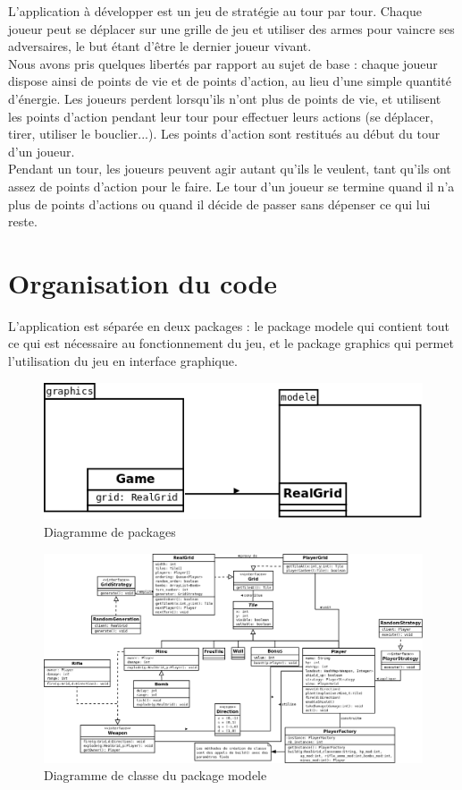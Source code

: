 \documentclass[a4paper,12pt]{article} %
\begin{document}
L'application à développer est un jeu de stratégie au tour par tour. Chaque joueur peut se déplacer sur une grille de jeu et utiliser des armes pour vaincre ses adversaires, le but étant d'être le dernier joueur vivant.\\
Nous avons pris quelques libertés par rapport au sujet de base : chaque joueur dispose ainsi de points de vie et de points d'action, au lieu d'une simple quantité d'énergie.
Les joueurs perdent lorsqu'ils n'ont plus de points de vie, et utilisent les points d'action pendant leur tour pour effectuer leurs actions (se déplacer, tirer, utiliser le bouclier...). Les points d'action sont restitués au début du tour d'un joueur.\\
Pendant un tour, les joueurs peuvent agir autant qu'ils le veulent, tant qu'ils ont assez de points d'action pour le faire. Le tour d'un joueur se termine quand il n'a plus de points d'actions ou quand il décide de passer sans dépenser ce qui lui reste.

\section{Organisation du code}

L'application est séparée en deux packages : le package modele qui contient tout ce qui est nécessaire au fonctionnement du jeu, et le package graphics qui permet l'utilisation du jeu en interface graphique.

\begin{figure}[!h]
\centering
\includegraphics[scale=0.5]{images/packages.png}
\caption{Diagramme de packages}
\end{figure}

\begin{figure}[!h]
\centering
\includegraphics[scale=0.33]{images/modele.png}
\caption{Diagramme de classe du package modele}
\end{figure}
\end{document}

